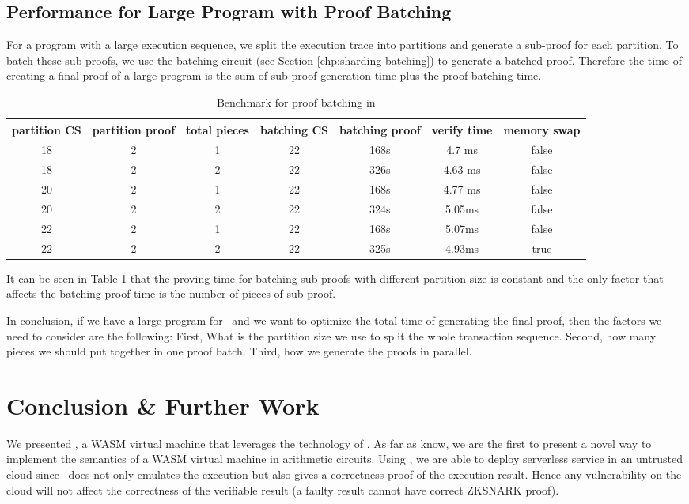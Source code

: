 \subsection{Performance for Large Program with Proof Batching}
For a program with a large execution sequence, we split the execution trace into partitions and generate a sub-proof for each partition. To batch these sub proofs, we use the batching circuit (see Section \ref{chp:sharding-batching}) to generate a batched proof. Therefore the time of creating a final proof of a large program is the sum of sub-proof generation time plus the proof batching time.
\begin{table}[!h]
\small
\begin{center}
\caption{Benchmark for proof batching in \zkwasm}
\label{tbl:proof-batching}
\begin{tabular}{ | c | c | c | c | c | c | c| }
  \hline
  partition CS & partition proof & total pieces& batching CS & batching proof & verify time & memory swap\\ 
  \hline
  18 & 2 & 1 & 22 & 168s & 4.7 ms & false\\
  \hline
  18 & 2 & 2 & 22 & 326s & 4.63 ms & false\\
  \hline
    20 & 2 & 1 & 22 & 168s & 4.77 ms & false \\
  \hline
    20 & 2 & 2 & 22 & 324s & 5.05ms & false\\
  \hline
    22 & 2 & 1 & 22 & 168s & 5.07ms & false\\
  \hline
    22 & 2 & 2 & 22 & 325s & 4.93ms & true \\
  \hline
\end{tabular}
\end{center}
\end{table}
It can be seen in Table \ref{tbl:proof-batching} that the proving time for batching sub-proofs with different partition size is constant and the only factor that affects the batching proof time is the number of pieces of sub-proof. 

In conclusion, if we have a large program for \zkwasm\, and we want to optimize the total time of generating the final proof, then the factors we need to consider are the following: First, What is the partition size we use to split the whole transaction sequence. Second, how many pieces we should put together in one proof batch. Third, how we generate the proofs in parallel.

\section{Conclusion \& Further Work}
\label{chp:conclusion}
We presented \zkwasm, a WASM virtual machine that leverages the technology of \zksnark. As far as know, we are the first to present a novel way to implement the semantics of a WASM virtual machine in arithmetic circuits. Using \zkwasm, we are able to deploy serverless service in an untrusted cloud since \zkwasm\, does not only emulates the execution but also gives a correctness proof of the execution result. Hence any vulnerability on the cloud will not affect the correctness of the verifiable result (a faulty result cannot have correct ZKSNARK proof).

